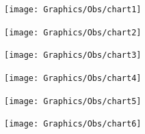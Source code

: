 \documentclass[a4paper,11pt]{exam}
\begin{document}
\newpage
{}\label{starchart}
\begin{center}
\end{center}
\texttt{[image: Graphics/Obs/chart1]}

\hspace*{1cm}
\begin{center}
\end{center}
\texttt{[image: Graphics/Obs/chart2]}

\filbreak
\begin{center}
\end{center}
\texttt{[image: Graphics/Obs/chart3]}

\hspace*{1cm}
\begin{center}
\end{center}
\texttt{[image: Graphics/Obs/chart4]}

\filbreak
{}\label{lastpage}
\begin{center}
\end{center}
\texttt{[image: Graphics/Obs/chart5]}

\hspace*{1cm}
\begin{center}
	
	\texttt{[image: Graphics/Obs/chart6]}
\end{center}
\end{document}
